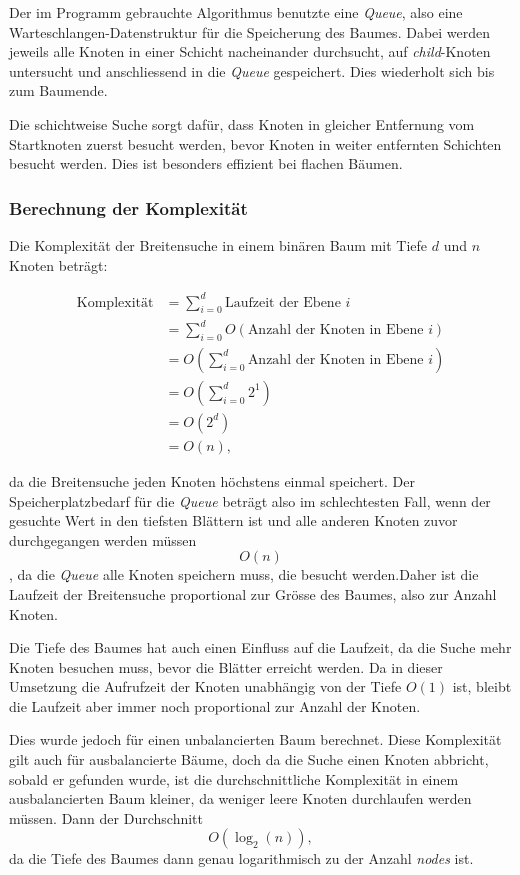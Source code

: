 \documentclass[a4paper,11pt]{article}
\begin{document}
Der im Programm gebrauchte Algorithmus benutzte eine \emph{Queue}, also eine Warteschlangen-Datenstruktur für die Speicherung des Baumes. Dabei werden jeweils alle Knoten in einer Schicht nacheinander durchsucht, auf \emph{child}-Knoten untersucht und anschliessend in die \emph{Queue} gespeichert. Dies wiederholt sich bis zum Baumende.

Die schichtweise Suche sorgt dafür, dass Knoten in gleicher Entfernung vom Startknoten zuerst besucht werden, bevor Knoten in weiter entfernten Schichten besucht werden. Dies ist besonders effizient bei flachen Bäumen.

\subsubsection{Berechnung der Komplexität}

Die Komplexität der Breitensuche in einem binären Baum mit Tiefe $d$ und $n$ Knoten beträgt:

\begin{align}
\text{Komplexität} &= \sum_{i=0}^{d} \text{Laufzeit der Ebene } i \\
&= \sum_{i=0}^{d} O(\text{Anzahl der Knoten in Ebene }i) \\
&= O(\sum_{i=0}^{d} \text{Anzahl der Knoten in Ebene }i) \\
&= O(\sum_{i=0}^{d} 2^1) \\
&= O(2^d) \\
&= O(n),
\end{align}

da die Breitensuche jeden Knoten höchstens einmal speichert. Der Speicherplatzbedarf für die \emph{Queue} beträgt also im schlechtesten Fall, wenn der gesuchte Wert in den tiefsten Blättern ist und alle anderen Knoten zuvor durchgegangen werden müssen $$O(n)$$, da die \emph{Queue} alle Knoten speichern muss, die besucht werden.Daher ist die Laufzeit der Breitensuche proportional zur Grösse des Baumes, also zur Anzahl Knoten.

Die Tiefe des Baumes hat auch einen Einfluss auf die Laufzeit, da die Suche mehr Knoten besuchen muss, bevor die Blätter erreicht werden. Da in dieser Umsetzung die Aufrufzeit der Knoten unabhängig von der Tiefe $O(1)$ ist, bleibt die Laufzeit aber immer noch proportional zur Anzahl der Knoten.

Dies wurde jedoch für einen unbalancierten Baum berechnet. Diese Komplexität gilt auch für ausbalancierte Bäume, doch da die Suche einen Knoten abbricht, sobald er gefunden wurde, ist die durchschnittliche Komplexität in einem ausbalancierten Baum kleiner, da weniger leere Knoten durchlaufen werden müssen. Dann der Durchschnitt $$O(\log_2(n)),$$ da die Tiefe des Baumes dann genau logarithmisch zu der Anzahl \emph{nodes} ist.
\end{document}
